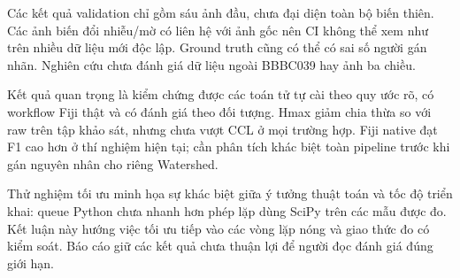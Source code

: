 \documentclass[12pt,a4paper,oneside]{report}
\begin{document}
Các kết quả validation chỉ gồm sáu ảnh đầu, chưa đại diện toàn bộ biến thiên. Các ảnh biến đổi nhiễu/mờ có liên hệ với ảnh gốc nên CI không thể xem như trên nhiều dữ liệu mới độc lập. Ground truth cũng có thể có sai số người gán nhãn. Nghiên cứu chưa đánh giá dữ liệu ngoài BBBC039 hay ảnh ba chiều.

Kết quả quan trọng là kiểm chứng được các toán tử tự cài theo quy ước rõ, có workflow Fiji thật và có đánh giá theo đối tượng. Hmax giảm chia thừa so với raw trên tập khảo sát, nhưng chưa vượt CCL ở mọi trường hợp. Fiji native đạt F1 cao hơn ở thí nghiệm hiện tại; cần phân tích khác biệt toàn pipeline trước khi gán nguyên nhân cho riêng Watershed.

Thử nghiệm tối ưu minh họa sự khác biệt giữa ý tưởng thuật toán và tốc độ triển khai: queue Python chưa nhanh hơn phép lặp dùng SciPy trên các mẫu được đo. Kết luận này hướng việc tối ưu tiếp vào các vòng lặp nóng và giao thức đo có kiểm soát. Báo cáo giữ các kết quả chưa thuận lợi để người đọc đánh giá đúng giới hạn.
\end{document}

